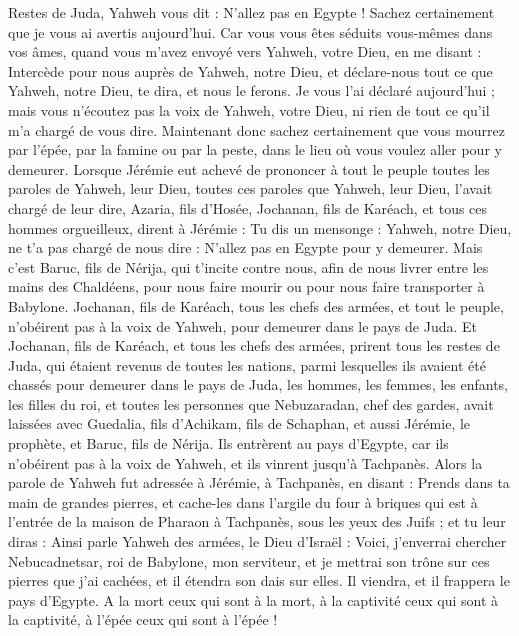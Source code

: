 \begin{multicols}{2}
Restes de Juda, Yahweh vous dit : N'allez pas en Egypte ! Sachez certainement que je vous ai avertis aujourd'hui.
Car vous vous êtes séduits vous-mêmes dans vos âmes, quand vous m'avez envoyé vers Yahweh, votre Dieu, en me disant : Intercède pour nous auprès de Yahweh, notre Dieu, et déclare-nous tout ce que Yahweh, notre Dieu, te dira, et nous le ferons.
Je vous l'ai déclaré aujourd'hui ; mais vous n'écoutez pas la voix de Yahweh, votre Dieu, ni rien de tout ce qu'il m'a chargé de vous dire.
Maintenant donc sachez certainement que vous mourrez par l'épée, par la famine ou par la peste, dans le lieu où vous voulez aller pour y demeurer.
\VerseOne{}Lorsque Jérémie eut achevé de prononcer à tout le peuple toutes les paroles de Yahweh, leur Dieu, toutes ces paroles que Yahweh, leur Dieu, l'avait chargé de leur dire,
Azaria, fils d'Hosée, Jochanan, fils de Karéach, et tous ces hommes orgueilleux, dirent à Jérémie : Tu dis un mensonge : Yahweh, notre Dieu, ne t'a pas chargé de nous dire : N'allez pas en Egypte pour y demeurer.
Mais c'est Baruc, fils de Nérija, qui t'incite contre nous, afin de nous livrer entre les mains des Chaldéens, pour nous faire mourir ou pour nous faire transporter à Babylone.
Jochanan, fils de Karéach, tous les chefs des armées, et tout le peuple, n'obéirent pas à la voix de Yahweh, pour demeurer dans le pays de Juda.
Et Jochanan, fils de Karéach, et tous les chefs des armées, prirent tous les restes de Juda, qui étaient revenus de toutes les nations, parmi lesquelles ils avaient été chassés pour demeurer dans le pays de Juda,
les hommes, les femmes, les enfants, les filles du roi, et toutes les personnes que Nebuzaradan, chef des gardes, avait laissées avec Guedalia, fils d'Achikam, fils de Schaphan, et aussi Jérémie, le prophète, et Baruc, fils de Nérija.
Ils entrèrent au pays d'Egypte, car ils n'obéirent pas à la voix de Yahweh, et ils vinrent jusqu'à Tachpanès.
Alors la parole de Yahweh fut adressée à Jérémie, à Tachpanès, en disant :
Prends dans ta main de grandes pierres, et cache-les dans l'argile du four à briques qui est à l'entrée de la maison de Pharaon à Tachpanès, sous les yeux des Juifs ;
et tu leur diras : Ainsi parle Yahweh des armées, le Dieu d'Israël : Voici, j'enverrai chercher Nebucadnetsar, roi de Babylone, mon serviteur, et je mettrai son trône sur ces pierres que j'ai cachées, et il étendra son dais sur elles.
Il viendra, et il frappera le pays d'Egypte. A la mort ceux qui sont à la mort, à la captivité ceux qui sont à la captivité, à l'épée ceux qui sont à l'épée !

\end{multicols}
